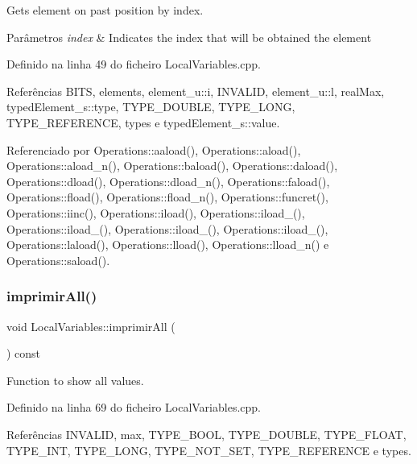 Gets element on past position by index. 


\begin{DoxyParams}{Parâmetros}
{\em index} & Indicates the index that will be obtained the element \\
\hline
\end{DoxyParams}


Definido na linha 49 do ficheiro Local\+Variables.\+cpp.



Referências B\+I\+TS, elements, element\+\_\+u\+::i, I\+N\+V\+A\+L\+ID, element\+\_\+u\+::l, real\+Max, typed\+Element\+\_\+s\+::type, T\+Y\+P\+E\+\_\+\+D\+O\+U\+B\+LE, T\+Y\+P\+E\+\_\+\+L\+O\+NG, T\+Y\+P\+E\+\_\+\+R\+E\+F\+E\+R\+E\+N\+CE, types e typed\+Element\+\_\+s\+::value.



Referenciado por Operations\+::aaload(), Operations\+::aload(), Operations\+::aload\+\_\+n(), Operations\+::baload(), Operations\+::daload(), Operations\+::dload(), Operations\+::dload\+\_\+n(), Operations\+::faload(), Operations\+::fload(), Operations\+::fload\+\_\+n(), Operations\+::funcret(), Operations\+::iinc(), Operations\+::iload(), Operations\+::iload\+\_(), Operations\+::iload\+\_(), Operations\+::iload\+\_(), Operations\+::iload\+\_(), Operations\+::laload(), Operations\+::lload(), Operations\+::lload\+\_\+n() e Operations\+::saload().

\mbox{\label{classLocalVariables_a6f51e8532ae59a4eea6801872d5f8444}} 
\subsubsection{\texorpdfstring{imprimir\+All()}{imprimirAll()}}
{\footnotesize\ttfamily void Local\+Variables\+::imprimir\+All (\begin{DoxyParamCaption}{ }\end{DoxyParamCaption}) const}



Function to show all values. 



Definido na linha 69 do ficheiro Local\+Variables.\+cpp.



Referências I\+N\+V\+A\+L\+ID, max, T\+Y\+P\+E\+\_\+\+B\+O\+OL, T\+Y\+P\+E\+\_\+\+D\+O\+U\+B\+LE, T\+Y\+P\+E\+\_\+\+F\+L\+O\+AT, T\+Y\+P\+E\+\_\+\+I\+NT, T\+Y\+P\+E\+\_\+\+L\+O\+NG, T\+Y\+P\+E\+\_\+\+N\+O\+T\+\_\+\+S\+ET, T\+Y\+P\+E\+\_\+\+R\+E\+F\+E\+R\+E\+N\+CE e types.

